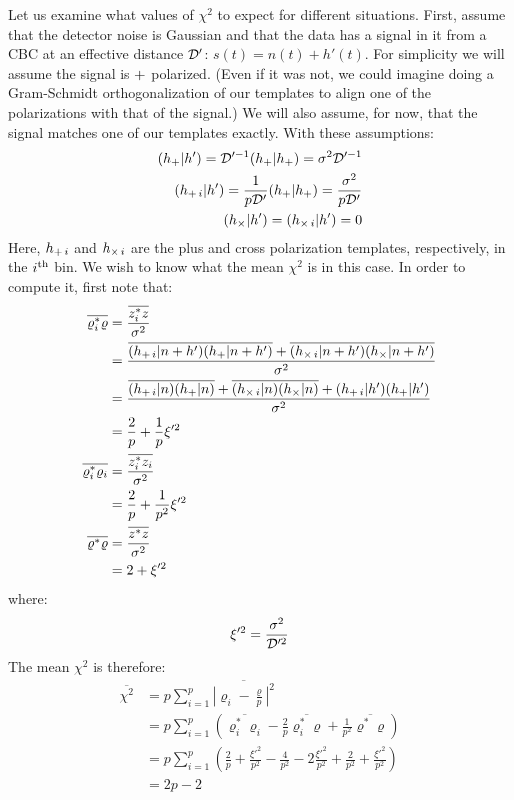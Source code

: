 Let us examine what values of $\chi^2$ to expect for different situations. First, assume that the detector noise is Gaussian and that the data has a signal in it from a \ac{CBC} at an effective distance $\mathcal{D}'$: $s(t) = n(t) + h'(t)$. For simplicity we will assume the signal is $+$ polarized. (Even if it was not, we could imagine doing a Gram-Schmidt orthogonalization of our templates to align one of the polarizations with that of the signal.) We will also assume, for now, that the signal matches one of our templates exactly. With these assumptions:
\begin{align}
(h_{+}|h') = \mathcal{D}'^{-1} (h_{+}|h_{+}) = \sigma^2\mathcal{D}'^{-1} \\
(h_{+\,i}|h') = \frac{1}{p\mathcal{D}'}(h_{+}|h_{+}) = \frac{\sigma^2}{p\mathcal{D}'} \\
(h_{\times}|h') = (h_{\times\,i}|h') = 0
\end{align}
Here, $h_{+\,i}$ and $h_{\times\,i}$ are the plus and cross polarization templates, respectively, in the $i^{\mathrm{th}}$ bin. We wish to know what the mean $\chi^2$ is in this case. In order to compute it, first note that:
\begin{align}
\overline{\varrho_i^{*}\varrho} &= \frac{\overline{z_i^*z}}{\sigma^2} \nonumber \\
    &= \frac{ \overline{ (h_{\pls \,i}|n+h')(h_{\pls}|n+h')} + \overline{(h_{\crs \,i}|n+h')(h_{\crs}|n+h') }}{\sigma^2} \nonumber \\
    &= \frac{ \overline{(h_{\pls\,i}|n)(h_\pls|n)} + \overline{(h_{\crs\,i}|n)(h_\crs|n)} + (h_{\pls\,i}|h')(h_{\pls}|h')}{\sigma^2} \nonumber \\
\label{eqn:rhoi_rho}
    &= \frac{2}{p} + \frac{1}{p}\xi'^2 \\
\overline{\varrho_i^{*}\varrho_i} &= \frac{\overline{z_i^*z_i}}{\sigma^2} \nonumber \\
\label{eqn:rhoi_rhoi}
    & = \frac{2}{p} + \frac{1}{p^2}\xi'^2 \\
\overline{\varrho^{*}\varrho} &= \frac{\overline{z^*z}}{\sigma^2} \nonumber \\
\label{eqn:rho_rho}
    &= 2 + \xi'^2
\end{align}
where:
\begin{equation}
\xi'^2 = \frac{\sigma^2}{\mathcal{D}'^2}
\end{equation}
The mean $\chi^2$ is therefore:
\begin{align}
\overline{\chi^2} &= p \sum_{i=1}^{p} \overline{\left| \varrho_i - \frac{\varrho}{p} \right|^2} \nonumber \\
 &= p \sum_{i=1}^{p} \left( \overline{ \varrho_i^*\varrho_i } - \frac{2}{p} \overline{\varrho_i^*\varrho} + \frac{1}{p^2}\overline{\varrho^*\varrho} \right) \nonumber \\
 &= p \sum_{i=1}^{p} \left( \frac{2}{p} + \frac{\xi'^2}{p^2} - \frac{4}{p^2} - 2 \frac{\xi'^2}{p^2} + \frac{2}{p^2} + \frac{\xi'^2}{p^2} \right) \\
\label{eqn:mean_chisq}
 &= 2p - 2
\end{align}
